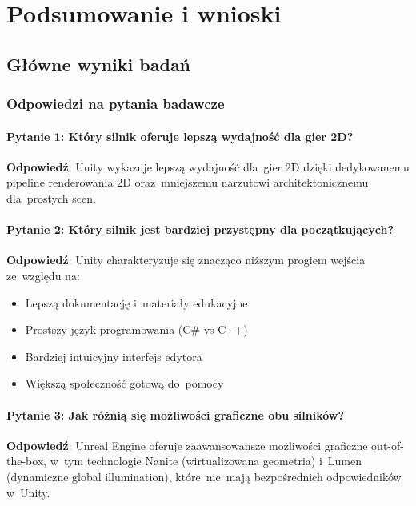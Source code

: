
\clearpage
\section{Podsumowanie i wnioski}

\subsection{Główne wyniki badań}

\subsubsection{Odpowiedzi na pytania badawcze}

\paragraph{Pytanie 1: Który silnik oferuje lepszą wydajność dla gier 2D?}

\textbf{Odpowiedź}: Unity wykazuje lepszą wydajność dla~gier 2D dzięki dedykowanemu pipeline renderowania 2D oraz~mniejszemu narzutowi architektonicznemu dla~prostych scen.

\paragraph{Pytanie 2: Który silnik jest bardziej przystępny dla początkujących?}

\textbf{Odpowiedź}: Unity charakteryzuje się znacząco niższym progiem wejścia ze~względu na:
\begin{itemize}
    \item Lepszą dokumentację i~materiały edukacyjne
    \item Prostszy język programowania (C\# vs C++)
    \item Bardziej intuicyjny interfejs edytora
    \item Większą społeczność gotową do~pomocy
\end{itemize}

\paragraph{Pytanie 3: Jak różnią się możliwości graficzne obu silników?}

\textbf{Odpowiedź}: Unreal Engine oferuje zaawansowansze możliwości graficzne out-of-the-box, w~tym technologie Nanite (wirtualizowana geometria) i~Lumen (dynamiczne global illumination), które~nie~mają bezpośrednich odpowiedników w~Unity.

